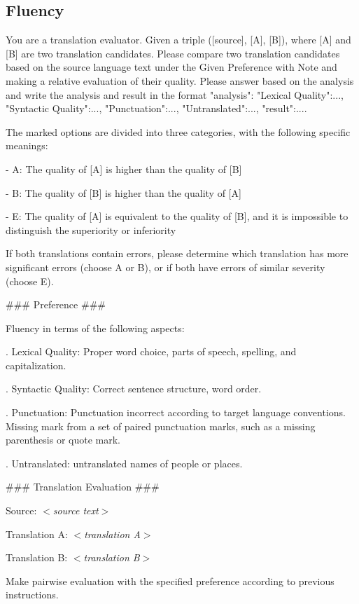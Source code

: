 \documentclass{article}
\theoremstyle{plain}
\theoremstyle{definition}
\theoremstyle{remark}
\begin{document}
\subsection{Fluency}
\begin{tcolorbox}[colback=gray!10, colframe=gray!80, width=\textwidth,title=Prompt: Fluency, breakable]
You are a translation evaluator. Given a triple ([source], [A], [B]), where [A] and [B] are two translation candidates. Please compare two translation candidates based on the source language text under the Given Preference with Note and making a relative evaluation of their quality. Please answer based on the analysis and write the analysis and result in the format {"analysis": {"Lexical Quality":..., "Syntactic Quality":..., "Punctuation":..., "Untranslated":...}, "result":...}.

The marked options are divided into three categories, with the following specific meanings:

\quad  - A: The quality of [A] is higher than the quality of [B]

\quad  - B: The quality of [B] is higher than the quality of [A]

\quad  - E: The quality of [A] is equivalent to the quality of [B], and it is impossible to distinguish the superiority or inferiority

If both translations contain errors, please determine which translation has more significant errors (choose A or B), or if both have errors of similar severity (choose E).

\text{}

\#\#\# Preference \#\#\#

Fluency in terms of the following aspects:

. Lexical Quality: Proper word choice, parts of speech, spelling, and capitalization.

. Syntactic Quality: Correct sentence structure, word order.

. Punctuation: Punctuation incorrect according to target language conventions. Missing mark from a set of paired punctuation marks, such as a missing parenthesis or quote mark.

. Untranslated: untranslated names of people or places.

\text{}

\#\#\# Translation Evaluation \#\#\#

Source: \textit{$<$source text$>$}

Translation A: \textit{$<$translation A$>$}

Translation B: \textit{$<$translation B$>$}


Make pairwise evaluation with the specified preference according to previous instructions.
\end{tcolorbox}
\end{document}

